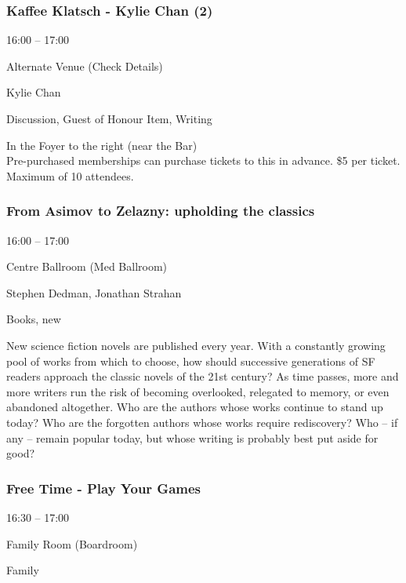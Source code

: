 \documentclass{scrreprt}
\begin{document}
\begin{multicols}{2}
\subsubsection*{Kaffee Klatsch - Kylie Chan (2)}\begin{description}
\setlength{\itemsep}{0pt}
\setlength{\parsep}{0pt}
\setlength{\parskip}{0pt}
\item[Time:]{16:00 -- 17:00}
\item[Venue:]{Alternate Venue (Check Details)}
\item[People:]{Kylie Chan}
\item[Tags:]{Discussion, Guest of Honour Item, Writing}\end{description}
In the Foyer to the right (near the Bar) \\Pre-purchased memberships can purchase tickets to this in advance. \$5 per ticket. Maximum of 10 attendees.
\subsubsection*{From Asimov to Zelazny: upholding the classics}\begin{description}
\setlength{\itemsep}{0pt}
\setlength{\parsep}{0pt}
\setlength{\parskip}{0pt}
\item[Time:]{16:00 -- 17:00}
\item[Venue:]{Centre Ballroom (Med Ballroom)}
\item[People:]{Stephen Dedman, Jonathan Strahan}
\item[Tags:]{Books, new}\end{description}
New science fiction novels are published every year. With a constantly growing pool of works from which to choose, how should successive generations of SF readers approach the classic novels of the 21st century? As time passes, more and more writers run the risk of becoming overlooked, relegated to memory, or even abandoned altogether. Who are the authors whose works continue to stand up today? Who are the forgotten authors whose works require rediscovery? Who – if any – remain popular today, but whose writing is probably best put aside for good?
\subsubsection*{Free Time - Play Your Games}\begin{description}
\setlength{\itemsep}{0pt}
\setlength{\parsep}{0pt}
\setlength{\parskip}{0pt}
\item[Time:]{16:30 -- 17:00}
\item[Venue:]{Family Room (Boardroom)}
\item[Tags:]{Family}\end{description}


\end{multicols}
\end{document}
